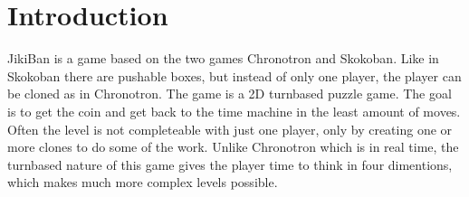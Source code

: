 \section{Introduction}
JikiBan is a game based on the two games Chronotron and Skokoban. Like in Skokoban there are pushable boxes, but instead of only one player, the player can be cloned as in Chronotron. The game is a 2D turnbased puzzle game. The goal is to get the coin and get back to the time machine in the least amount of moves. Often the level is not completeable with just one player, only by creating one or more clones to do some of the work. Unlike Chronotron which is in real time, the turnbased nature of this game gives the player time to think in four dimentions, which makes much more complex levels possible.